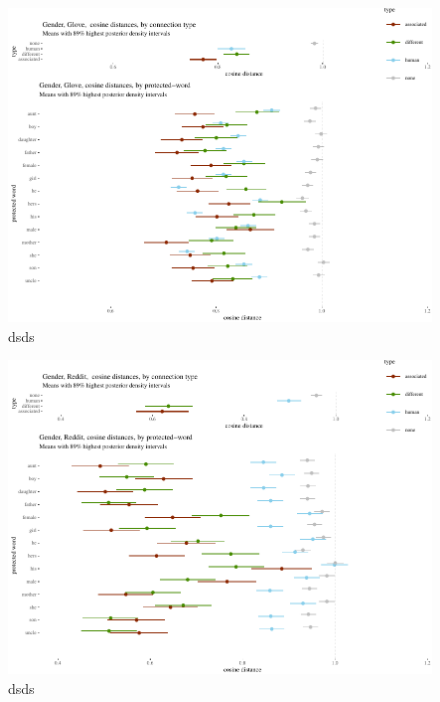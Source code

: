 \documentclass[
  10pt,
  dvipsnames,enabledeprecatedfontcommands]{scrartcl}
\begin{document}
\begin{figure}

\begin{center}\includegraphics[width=1.1\linewidth]{paperDraft6_files/figure-latex/unnamed-chunk-14-1} \end{center}
\caption{dsds}
\label{fig:genderGlove}
\end{figure}

\begin{figure}

\begin{center}\includegraphics[width=1.1\linewidth]{paperDraft6_files/figure-latex/unnamed-chunk-15-1} \end{center}
\caption{dsds}
\label{fig:genderReddit}
\end{figure}
\end{document}

